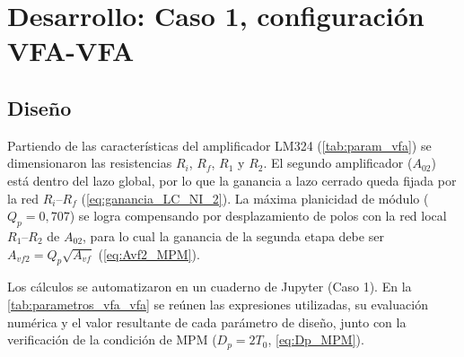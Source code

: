 \section{Desarrollo: Caso 1, configuración VFA-VFA}
\label{sec:desarrollo_c1}

\subsection{Diseño}
\label{sec:diseno_c1}

Partiendo de las características del amplificador LM324 (\autoref{tab:param_vfa}) se dimensionaron las resistencias $R_i$, $R_f$, $R_1$ y $R_2$. El segundo amplificador ($A_{02}$) está dentro del lazo global, por lo que la ganancia a lazo cerrado queda fijada por la red $R_i$--$R_f$ (\autoref{eq:ganancia_LC_NI_2}). La máxima planicidad de módulo ($Q_p = 0{,}707$) se logra compensando por desplazamiento de polos con la red local $R_1$--$R_2$ de $A_{02}$, para lo cual la ganancia de la segunda etapa debe ser $A_{vf2} = Q_p\sqrt{A_{vf}}$ (\autoref{eq:Avf2_MPM}).

Los cálculos se automatizaron en un cuaderno de Jupyter (Caso 1). En la \autoref{tab:parametros_vfa_vfa} se reúnen las expresiones utilizadas, su evaluación numérica y el valor resultante de cada parámetro de diseño, junto con la verificación de la condición de MPM ($D_p = 2T_0$, \autoref{eq:Dp_MPM}).

